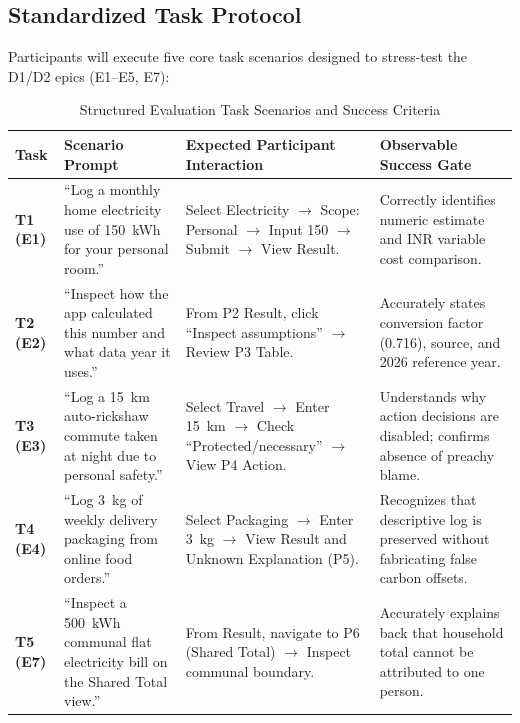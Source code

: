 \documentclass[12pt,a4paper]{article}
\begin{document}
\subsection{Standardized Task Protocol}
Participants will execute five core task scenarios designed to stress-test the D1/D2 epics (E1--E5, E7):

\begin{table}[ht]
\centering
\small
\caption{Structured Evaluation Task Scenarios and Success Criteria}
\begin{tabularx}{\textwidth}{@{}p{1.2cm}p{4.0cm}p{5.5cm}X@{}}
\toprule
\textbf{Task} & \textbf{Scenario Prompt} & \textbf{Expected Participant Interaction} & \textbf{Observable Success Gate}\\
\midrule
\textbf{T1 (E1)} & ``Log a monthly home electricity use of 150~kWh for your personal room.'' & Select Electricity $\rightarrow$ Scope: Personal $\rightarrow$ Input 150 $\rightarrow$ Submit $\rightarrow$ View Result. & Correctly identifies numeric estimate and INR variable cost comparison.\\
\textbf{T2 (E2)} & ``Inspect how the app calculated this number and what data year it uses.'' & From P2 Result, click ``Inspect assumptions'' $\rightarrow$ Review P3 Table. & Accurately states conversion factor (0.716), source, and 2026 reference year.\\
\textbf{T3 (E3)} & ``Log a 15~km auto-rickshaw commute taken at night due to personal safety.'' & Select Travel $\rightarrow$ Enter 15~km $\rightarrow$ Check ``Protected/necessary'' $\rightarrow$ View P4 Action. & Understands why action decisions are disabled; confirms absence of preachy blame.\\
\textbf{T4 (E4)} & ``Log 3~kg of weekly delivery packaging from online food orders.'' & Select Packaging $\rightarrow$ Enter 3~kg $\rightarrow$ View Result and Unknown Explanation (P5). & Recognizes that descriptive log is preserved without fabricating false carbon offsets.\\
\textbf{T5 (E7)} & ``Inspect a 500~kWh communal flat electricity bill on the Shared Total view.'' & From Result, navigate to P6 (Shared Total) $\rightarrow$ Inspect communal boundary. & Accurately explains back that household total cannot be attributed to one person.\\
\bottomrule
\end{tabularx}
\end{table}
\end{document}
